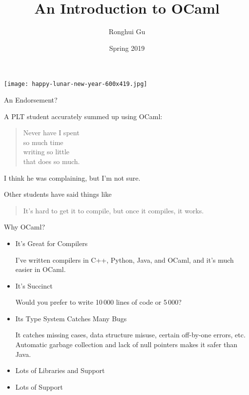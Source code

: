 \documentclass{plt}
\title{An Introduction to OCaml}
\author{Ronghui Gu}
\institute{Columbia University}
\date{Spring 2019}
\begin{document}
\frame{\titlepage}


\begin{frame}
\vspace{25pt}
\texttt{[image: happy-lunar-new-year-600x419.jpg]}
\thispagestyle{empty}
\end{frame}


\begin{frame}{An Endorsement?}

A PLT student accurately summed up using OCaml:

\begin{quote}
Never have I spent \\ so much time \\ writing so little \\ that does so much.
\end{quote}

I think he was complaining, but I'm not sure.

Other students have said things like

\begin{quote}
It's hard to get it to compile, but once it compiles, it works.
\end{quote}

\end{frame}

\begin{frame}{Why OCaml?}

  \begin{itemize}
  \item \alert{It's Great for Compilers}

    I've written compilers in C++, Python, Java, and OCaml, and it's much
    easier in OCaml.

  \item \alert{It's Succinct}

    Would you prefer to write 10\,000 lines of code or 5\,000?
    
  \item \alert{Its Type System Catches Many Bugs}

    It catches missing cases, data structure misuse, certain off-by-one
    errors, etc.  Automatic garbage collection and lack of null pointers
    makes it safer than Java.
    
  \item \alert{Lots of Libraries and Support}
  

  \item \alert{ Lots of Support}
    

\end{itemize}
\end{frame}
\end{document}
